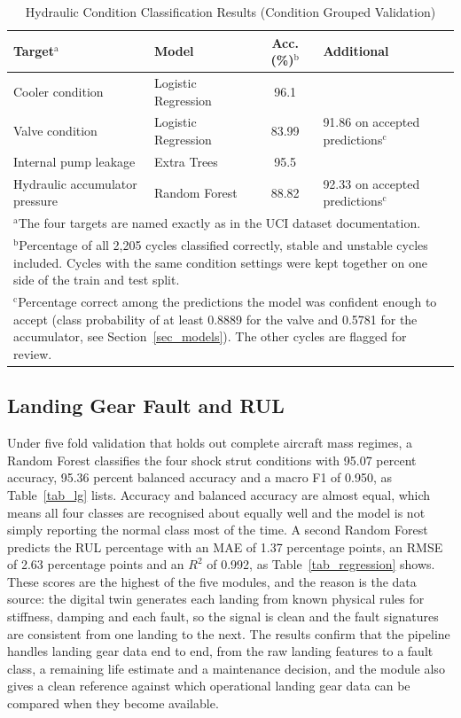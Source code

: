 \documentclass[conference]{IEEEtran}
\begin{document}
\begin{table}[htbp]
\caption{Hydraulic Condition Classification Results (Condition Grouped Validation)}
\begin{center}
\footnotesize
\setlength{\tabcolsep}{3pt}
\begin{tabular}{|p{0.9in}|p{0.7in}|c|p{0.9in}|}
\hline
\textbf{Target}$^{\mathrm{a}}$ & \textbf{Model} & \textbf{Acc. (\%)}$^{\mathrm{b}}$ & \textbf{Additional} \\
\hline
Cooler condition & Logistic Regression & 96.1 & \\
\hline
Valve condition & Logistic Regression & 83.99 & 91.86 on accepted predictions$^{\mathrm{c}}$ \\
\hline
Internal pump leakage & Extra Trees & 95.5 & \\
\hline
Hydraulic accumulator pressure & Random Forest & 88.82 & 92.33 on accepted predictions$^{\mathrm{c}}$ \\
\hline
\multicolumn{4}{p{3.0in}}{$^{\mathrm{a}}$The four targets are named exactly as in the UCI dataset documentation.} \\
\multicolumn{4}{p{3.0in}}{$^{\mathrm{b}}$Percentage of all 2,205 cycles classified correctly, stable and unstable cycles included. Cycles with the same condition settings were kept together on one side of the train and test split.} \\
\multicolumn{4}{p{3.0in}}{$^{\mathrm{c}}$Percentage correct among the predictions the model was confident enough to accept (class probability of at least 0.8889 for the valve and 0.5781 for the accumulator, see Section~\ref{sec_models}). The other cycles are flagged for review.}
\end{tabular}
\label{tab_hydraulic}
\end{center}
\end{table}

\subsection{Landing Gear Fault and RUL}
Under five fold validation that holds out complete aircraft mass regimes, a Random Forest classifies the four shock strut conditions with 95.07 percent accuracy, 95.36 percent balanced accuracy and a macro F1 of 0.950, as Table~\ref{tab_lg} lists. Accuracy and balanced accuracy are almost equal, which means all four classes are recognised about equally well and the model is not simply reporting the normal class most of the time. A second Random Forest predicts the RUL percentage with an MAE of 1.37 percentage points, an RMSE of 2.63 percentage points and an $R^2$ of 0.992, as Table~\ref{tab_regression} shows. These scores are the highest of the five modules, and the reason is the data source: the digital twin generates each landing from known physical rules for stiffness, damping and each fault, so the signal is clean and the fault signatures are consistent from one landing to the next. The results confirm that the pipeline handles landing gear data end to end, from the raw landing features to a fault class, a remaining life estimate and a maintenance decision, and the module also gives a clean reference against which operational landing gear data can be compared when they become available.
\end{document}
